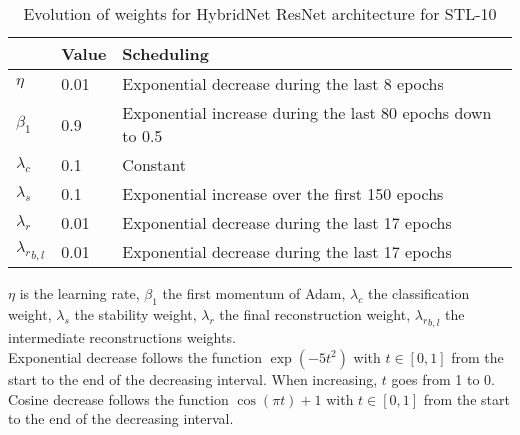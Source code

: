 \documentclass[runningheads]{llncs}
\begin{document}
\begin{table}[htbp]
\centering
\caption{Evolution of weights for HybridNet ResNet architecture for STL-10}
\label{tab:resnetschedstl}
\begin{threeparttable}
\setlength{\tabcolsep}{4pt}
\begin{tabular}{ l l l}
\toprule
 & Value & Scheduling \\
\midrule
$\eta$ & 0.01 & Exponential decrease during the last 8 epochs \\
$\beta_1$ & 0.9 & Exponential increase during the last 80 epochs down to 0.5 \\
$\lambda_c$ & 0.1 & Constant \\
$\lambda_s$ & 0.1 & Exponential increase over the first 150 epochs \\
$\lambda_r$ & 0.01 & Exponential decrease during the last 17 epochs \\
${\lambda_r}_{b,l}$ & 0.01 & Exponential decrease during the last 17 epochs \\
\bottomrule
\end{tabular}
\begin{tablenotes}
$\eta$ is the learning rate, $\beta_1$ the first momentum of Adam, $\lambda_c$ the classification weight, $\lambda_s$ the stability weight, $\lambda_r$ the final reconstruction weight, ${\lambda_r}_{b,l}$ the intermediate reconstructions weights.\\
Exponential decrease follows the function $\exp(-5t^2)$ with $t\in[0,1]$ from the start to the end of the decreasing interval. When increasing, $t$ goes from 1 to 0.\\
Cosine decrease follows the function $\cos(\pi t)+1$ with $t\in[0,1]$ from the start to the end of the decreasing interval.
\end{tablenotes}
\end{threeparttable}
\end{table}


 
\end{document}
